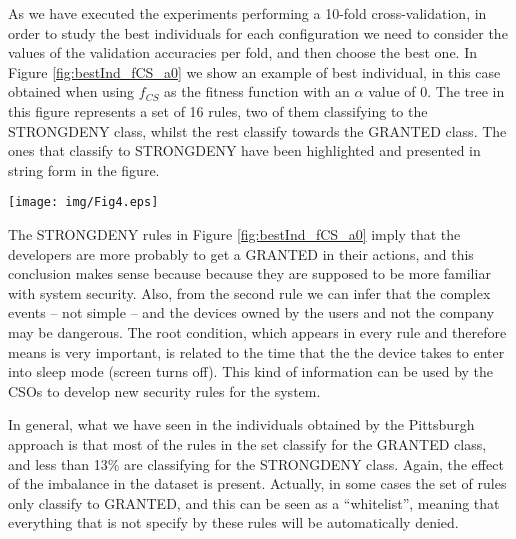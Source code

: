 As we have executed the experiments performing a 10-fold cross-validation, in order to study the best individuals for each configuration we need to consider the values of the validation accuracies per fold, and then choose the best one. In Figure \ref{fig:bestInd_fCS_a0} we show an example of best individual, in this case obtained when using $f_{CS}$ as the fitness function with an $\alpha$ value of 0. The tree in this figure represents a set of 16 rules, two of them classifying to the STRONGDENY class, whilst the rest classify towards the GRANTED class. The ones that classify to STRONGDENY have been highlighted and presented in string form in the figure.

\begin{figure*}[h!tb]
	\centering
	\texttt{[image: img/Fig4.eps]}
	\caption{An example of best individual obtained when using
          $f_{CS}$ as the fitness function with an $\alpha$ value of
          0. This tree represents a set of 16 rules, two of them
          classifying to the STRONGDENY class, whilst the rest
          classify towards the GRANTED class.} 
	\label{fig:bestInd_fCS_a0}
\end{figure*}

The STRONGDENY rules in Figure \ref{fig:bestInd_fCS_a0} imply that the developers are more probably to get a GRANTED in their actions, and this conclusion makes sense because because they are supposed to be more familiar with system security. Also, from the second rule we can infer that the complex events -- not simple -- and the devices owned by the users and not the company may be dangerous. The root condition, which appears in every rule and therefore means is very important, is related to the time that the the device takes to enter into sleep mode (screen turns off). This kind of information can be used by the CSOs to develop new security rules for the system.

In general, what we have seen in the individuals obtained by the
Pittsburgh approach is that most of the rules in the set classify for
the GRANTED class, and less than 13\% are classifying for the
STRONGDENY class. Again, the effect of the imbalance in the dataset is
present. Actually, in some cases the set of rules only classify to
GRANTED, and this can be seen as a ``whitelist'', meaning that
everything that is not specify by these rules will be automatically
denied.


